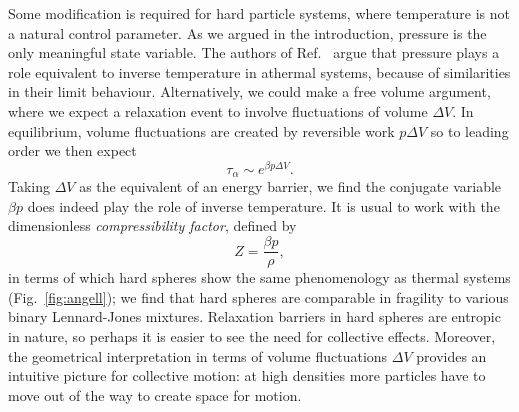 \documentclass[11pt,twoside]{report}
\begin{document}
Some modification is required for hard particle systems, where temperature is not a natural control parameter.
As we argued in the introduction, pressure is the only meaningful state variable.
The authors of Ref.\ \cite{BerthierPRE2009} argue that pressure plays a role equivalent to inverse temperature in athermal systems, because of similarities in their limit behaviour.
Alternatively, we could make a free volume argument, where we expect a relaxation event to involve fluctuations of volume $\Delta V$.
In equilibrium, volume fluctuations are created by reversible work $p \Delta V$ so to leading order%
we then expect
\begin{equation*}
  \tau_\alpha \sim e^{\beta p \Delta V}.
\end{equation*}
Taking $\Delta V$ as the equivalent of an energy barrier, we find the conjugate variable $\beta p$ does indeed play the role of inverse temperature.
It is usual to work with the dimensionless \emph{compressibility factor}, defined by
\begin{equation}
  Z = \frac{\beta p}{\rho},
\end{equation}
in terms of which hard spheres show the same phenomenology as thermal systems (Fig.\ \ref{fig:angell}); we find that hard spheres are comparable in fragility to various binary Lennard-Jones mixtures.
Relaxation barriers in hard spheres are entropic in nature, so perhaps it is easier to see the need for collective effects.
Moreover, the geometrical interpretation in terms of volume fluctuations $\Delta V$ provides an intuitive picture for collective motion: at high densities more particles have to move out of the way to create space for motion.
\end{document}
